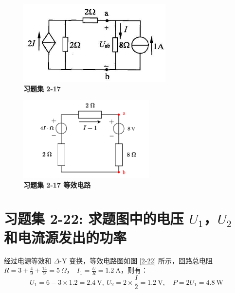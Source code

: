 \documentclass[UTF8]{report}
\theoremstyle{MyLineTheoremStyle} %
\theoremstyle{MyBlockTheoremStyle} %
\theoremstyle{MySubsubsectionStyle} %
\begin{document}
\noindent\begin{minipage}{0.49\textwidth}
\begin{figure}[H]\centering
\includegraphics[height=120pt]{assets/2/78473b1c403974e048249bbdbf6a152f.jpg}
\caption{\textbf{习题集 2-17}}
\end{figure}
\end{minipage}\hfill
\begin{minipage}{0.49\textwidth}
\begin{figure}[H]\centering
\includegraphics[height=120pt]{assets/2/2-17.drawio.pdf}
\caption{\textbf{习题集 2-17 等效电路}}\label{2-17}
\end{figure}
\end{minipage}



\section{习题集 2-22: 求题图中的电压 $U_1$，$U_2$ 和电流源发出的功率}

经过电源等效和 $\Delta$-Y 变换，等效电路图如图 \ref{2-22} 所示，回路总电阻 $R = 3 + \frac{4}{9} + \frac{14}{9} = 5\ \Omega$，\ $I_1 = \frac{U}{R} = 1.2\ \mathrm{A}$，则有：
\begin{equation*}
U_1 = 6 - 3\times 1.2 = 2.4\ \mathrm{V},\ U_2 = 2\times \frac{I}{2} = 1.2\ \mathrm{V},\quad P = 2 U_1 = 4.8\ \mathrm{W}
\end{equation*}
\end{document}

